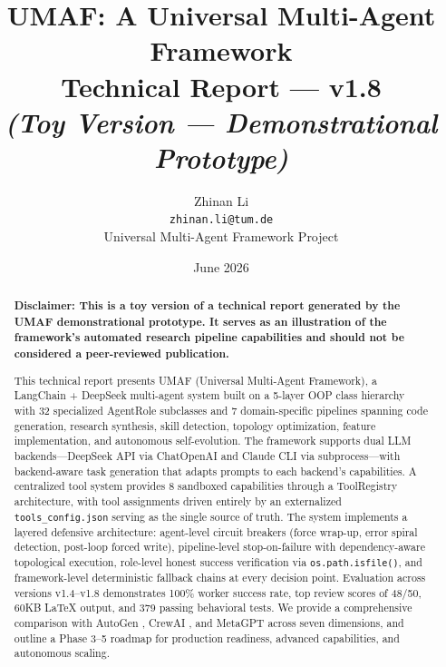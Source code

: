 \documentclass[11pt,a4paper]{article}
\title{\textbf{UMAF: A Universal Multi-Agent Framework}\\[0.3em]
\large Technical Report — v1.8\\[0.3em]
\small\textit{(Toy Version — Demonstrational Prototype)}}
\author{Zhinan Li\\[0.2em]
\small\texttt{zhinan.li@tum.de}\\[0.4em]
Universal Multi-Agent Framework Project}
\date{June 2026}
\begin{document}
\maketitle

\begin{abstract}
\textbf{Disclaimer: This is a toy version of a technical report generated by the UMAF demonstrational prototype. It serves as an illustration of the framework's automated research pipeline capabilities and should not be considered a peer-reviewed publication.}

This technical report presents UMAF (Universal Multi-Agent Framework), a LangChain + DeepSeek multi-agent system built on a 5-layer OOP class hierarchy with 32 specialized AgentRole subclasses and 7 domain-specific pipelines spanning code generation, research synthesis, skill detection, topology optimization, feature implementation, and autonomous self-evolution. The framework supports dual LLM backends---DeepSeek API via ChatOpenAI and Claude CLI via subprocess---with backend-aware task generation that adapts prompts to each backend's capabilities. A centralized tool system provides 8 sandboxed capabilities through a ToolRegistry architecture, with tool assignments driven entirely by an externalized \texttt{tools\_config.json} serving as the single source of truth. The system implements a layered defensive architecture: agent-level circuit breakers (force wrap-up, error spiral detection, post-loop forced write), pipeline-level stop-on-failure with dependency-aware topological execution, role-level honest success verification via \texttt{os.path.isfile()}, and framework-level deterministic fallback chains at every decision point. Evaluation across versions v1.4--v1.8 demonstrates 100\% worker success rate, top review scores of 48/50, 60KB LaTeX output, and 379 passing behavioral tests. We provide a comprehensive comparison with AutoGen \cite{autogen}, CrewAI \cite{crewai}, and MetaGPT \cite{metagpt} across seven dimensions, and outline a Phase 3--5 roadmap for production readiness, advanced capabilities, and autonomous scaling.
\end{abstract}

\tableofcontents
\newpage


\newpage

\newpage

\newpage

\newpage

\newpage

\newpage

\newpage

\newpage

\newpage

\end{document}
